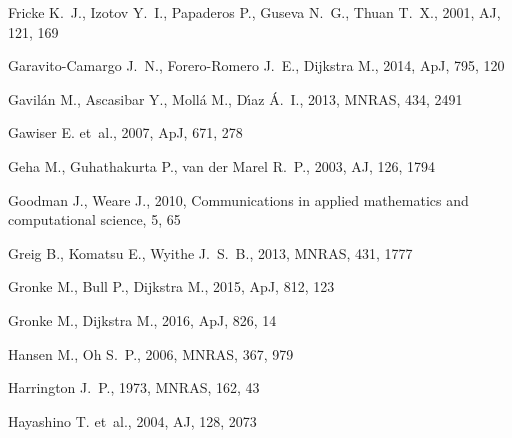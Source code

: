 \documentclass[a4,useAMS,usenatbib,usegraphicx]{mn2e}
\newcommand{\apj}{ApJ}
\newcommand{\aj}{AJ}
\newcommand{\mnras}{MNRAS}
\begin{document}
\begin{thebibliography}{}
{Fricke} K.~J.,  {Izotov} Y.~I.,  {Papaderos} P.,  {Guseva} N.~G.,    {Thuan}
  T.~X.,  2001, \aj, 121, 169

{Garavito-Camargo} J.~N.,  {Forero-Romero} J.~E.,    {Dijkstra} M.,  2014,
  \apj, 795, 120

{Gavil{\'a}n} M.,  {Ascasibar} Y.,  {Moll{\'a}} M.,    {D{\'{\i}}az} {\'A}.~I.,
   2013, \mnras, 434, 2491

{Gawiser} E.  et~al., 2007, \apj, 671, 278

{Geha} M.,  {Guhathakurta} P.,    {van der Marel} R.~P.,  2003, \aj, 126, 1794

Goodman J.,  Weare J.,  2010, Communications in applied mathematics and
  computational science, 5, 65

{Greig} B.,  {Komatsu} E.,    {Wyithe} J.~S.~B.,  2013, \mnras, 431, 1777

{Gronke} M.,  {Bull} P.,    {Dijkstra} M.,  2015, \apj, 812, 123

{Gronke} M.,  {Dijkstra} M.,  2016, \apj, 826, 14

{Hansen} M.,  {Oh} S.~P.,  2006, \mnras, 367, 979

{Harrington} J.~P.,  1973, \mnras, 162, 43

{Hayashino} T.  et~al., 2004, \aj, 128, 2073


\end{thebibliography}
\end{document}
